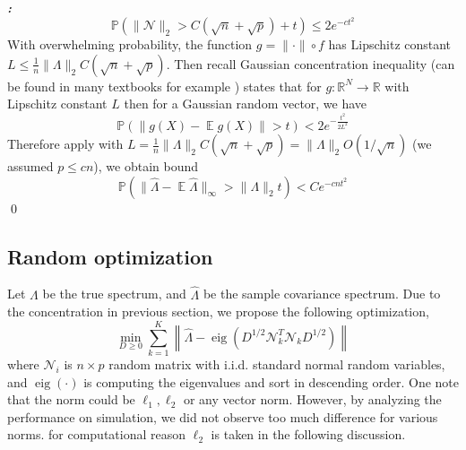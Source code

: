 \documentclass[12pt]{extarticle}
\renewenvironment{proof}[1][\proofname]{ { \it\bfseries #1: }}{\qed}
\newcommand{\cN}{{\mathcal{N}}}
\newcommand{\field}[1]{\mathbb{#1}}
\newcommand{\R}{\field{R}}
\newcommand{\1}{\field{1}}
\newcommand{\p}{\field{P}}
\DeclareMathOperator{\E}{\mathbb{E}}
\DeclareMathOperator*{\eig}{eig}
\numberwithin{equation}{section}
\begin{document}
\begin{proof}
\[
\p( \|\cN\|_2 > C(\sqrt{n}+\sqrt{p}) +t ) \le 2e^{-ct^2}
\]
With overwhelming probability, the function $g =\|\cdot \| \circ f$ has Lipschitz constant $L\le \frac{1}{n}\|{\Lambda}\|_2 C(\sqrt{n}+\sqrt{p})$. Then recall Gaussian concentration inequality (can be found in many textbooks for example \cite{boucheron2013concentration}) states that for $g: \R^N \to \R$ with Lipschitz constant $L$ then for a Gaussian random vector, we have 
\[
\p \left(\|g(X) - \E g(X)\|>t\right)<2 e^{-\frac{t^2}{2L^2}}
\]
Therefore apply with $L=\frac{1}{n}\|{\Lambda}\|_2 C(\sqrt{n}+\sqrt{p}) =\|{\Lambda}\|_2O(1/\sqrt{n})$ (we assumed $p\le c n$), we obtain  bound
\[
\p \left(\|\hat{\Lambda} - \E \hat{\Lambda}\|_{\infty} >\|\Lambda\|_2 t \right)<C e^{-cnt^2}
\]
\end{proof}

\subsection{Random optimization} \label{sec:random optimization}
Let $\Lambda$ be the true spectrum, and $\hat{\Lambda}$ be the sample covariance spectrum. Due to the concentration in previous section, we propose the following optimization,
\begin{equation}\label{eqn: optimization}
\min_{{D}\geq 0} \sum_{k=1}^K \left\| \hat{\Lambda}- \eig({D}^{1/2} \cN_k^T \cN_k {D}^{1/2} )    \right\|
\end{equation}
where $\cN_i$ is $n\times p$  random matrix with i.i.d. standard normal random variables, and $\eig(\cdot)$ is computing the eigenvalues and sort in descending order. One note that the norm could be $\ell_1, \ell_2$ or any vector norm. However, by analyzing the performance on simulation, we did not observe too much difference for various norms.  for computational reason $\ell_2$ is taken in the following discussion.
\end{document}
